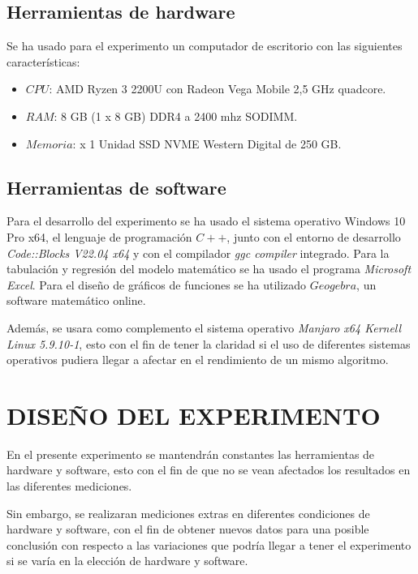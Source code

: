 \documentclass[11pt, twocolumn]{llncs}
\begin{document}
\subsection{Herramientas de hardware}
Se ha usado para el experimento un computador de escritorio con las siguientes características:

\begin{itemize}
    \item $CPU$: AMD Ryzen 3 2200U con Radeon Vega Mobile 2,5 GHz quadcore.
    \item $RAM$: 8 GB (1 x 8 GB) DDR4 a 2400 mhz SODIMM.
    \item $Memoria$: x 1 Unidad SSD NVME Western Digital de 250 GB.
\end{itemize}

\subsection{Herramientas de software}
Para el desarrollo del experimento se ha usado el sistema operativo Windows 10 Pro x64, el lenguaje de programación $C++$, junto con el entorno de desarrollo \textit{Code::Blocks V22.04 x64} y con el compilador \textit{ggc compiler} integrado. Para la tabulación y regresión del modelo matemático se ha usado el programa \textit{Microsoft Excel}. Para el diseño de gráficos de funciones se ha utilizado $Geogebra$, un software matemático online.

Además, se usara como complemento el sistema operativo \textit{Manjaro x64 Kernell Linux 5.9.10-1}, esto con el fin de tener la claridad si el uso de diferentes sistemas operativos pudiera llegar a afectar en el rendimiento de un mismo algoritmo.

\section{DISEÑO DEL EXPERIMENTO}\label{diseño}
En el presente experimento se mantendrán constantes las herramientas de hardware y software, esto con el fin de que no se vean afectados los resultados en las diferentes mediciones.

Sin embargo, se realizaran mediciones extras en diferentes condiciones de hardware y software, con el fin de obtener nuevos datos para una posible conclusión con respecto a las variaciones que podría llegar a tener el experimento si se varía en la elección de hardware y software.
\end{document}
